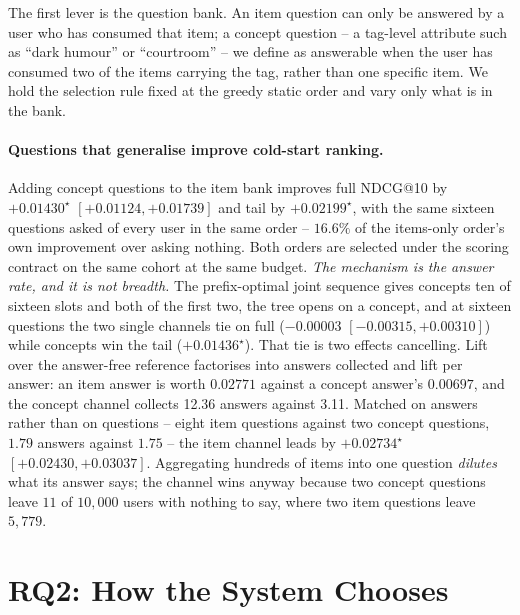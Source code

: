 \documentclass[runningheads]{llncs}
\begin{document}
The first lever is the question bank. An item question can only be answered by a user who has consumed that item; a concept question -- a tag-level attribute such as ``dark humour'' or ``courtroom'' -- we define
as answerable when the user has consumed two of the items carrying the tag, rather than one specific
item. We hold the selection rule fixed
at the greedy static order and vary only what is in the bank.

\paragraph{Questions that generalise improve cold-start ranking.}
Adding concept questions to the item bank improves full NDCG@10 by
$+0.01430^\star$ $[+0.01124,+0.01739]$ and tail by $+0.02199^\star$, with the same sixteen questions asked of every user in the same order
-- $16.6\%$ of the items-only order's own improvement over asking nothing. Both orders are selected under
the scoring contract on the same cohort at the same budget. \emph{The mechanism is the answer rate, and it is not breadth.} The prefix-optimal joint
sequence gives concepts ten of sixteen slots and both of the first two, the tree opens on a concept,
and at sixteen questions the two single channels tie on full ($-0.00003$ $[-0.00315,+0.00310]$) while
concepts win the tail ($+0.01436^\star$). That tie is two effects cancelling. Lift over the answer-free reference factorises into answers
collected and lift per answer: an item answer is worth $0.02771$ against a concept answer's
$0.00697$, and the concept channel collects 12.36 answers against 3.11.
Matched on answers rather than on questions -- eight item questions against two concept questions,
$1.79$ answers against $1.75$ -- the item channel leads by $+0.02734^\star$ $[+0.02430,+0.03037]$.
Aggregating hundreds of items into one question \emph{dilutes} what its answer says; the channel wins anyway because two concept questions
leave $11$ of $10{,}000$ users with nothing to say, where two item questions leave $5{,}779$.

\section{RQ2: How the System Chooses}
\label{sec:rq2}
\end{document}
